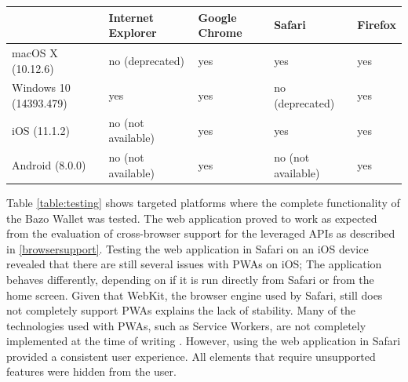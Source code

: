 \begin{center}
    \begin{tabular}{ | l | l | l | l | p{2cm} |}
    \hline
      & Internet Explorer & Google Chrome & Safari & Firefox \\ \hline
    macOS X (10.12.6)  & no (deprecated) & yes & yes & yes \\ \hline
    Windows 10 (14393.479)  & yes & yes & no (deprecated) & yes \\ \hline
    iOS (11.1.2)  & no (not available) & yes & yes & yes \\ \hline
    Android (8.0.0)  & no (not available) & yes & no (not available) & yes \\ \hline
    \end{tabular}
    \label{table:testing}
    \end{center}
Table \ref{table:testing} shows targeted platforms where the complete functionality of the Bazo Wallet was tested. The web application proved to work as expected from the evaluation of cross-browser support for the leveraged APIs as described in \ref{browsersupport}. Testing the web application in Safari on an iOS device revealed that there are still several issues with PWAs on iOS; The application behaves differently, depending on if it is run directly from Safari or from the home screen. Given that WebKit, the browser engine used by Safari, still does not completely support PWAs explains the lack of stability. Many of the technologies used with PWAs, such as Service Workers, are not completely implemented at the time of writing \cite{webkitsw}. However, using the web application in Safari provided a consistent user experience. All elements that require unsupported features were hidden from the user.

